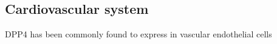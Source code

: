 \subsection{Cardiovascular system}
DPP4 has been commonly found to express in vascular endothelial cells~